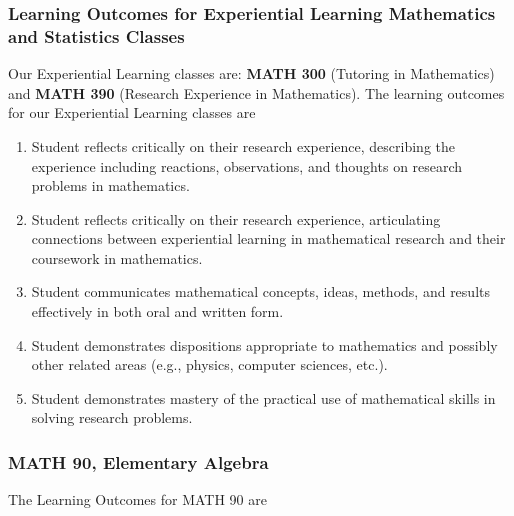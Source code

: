 \documentclass[10pt]{article}
\newenvironment{alphalist}{
\begin{enumerate}[label=(\arabic*),widest=107 ,leftmargin=25pt, itemsep=0pt]}
{\end{enumerate}}
\begin{document}
\subsubsection*{Learning Outcomes for Experiential Learning Mathematics and Statistics Classes}

Our Experiential Learning classes are: \textbf{MATH 300} 
(Tutoring in Mathematics) and \textbf{MATH 390} (Research Experience in Mathematics).
The learning outcomes for our Experiential Learning classes are
\begin{alphalist}
    \item  Student reflects critically on their research experience, describing the experience including reactions, observations, and thoughts on research problems in mathematics.
\item Student reflects critically on their research experience, articulating connections between experiential learning in mathematical research and their coursework in mathematics.
\item Student communicates mathematical concepts, ideas, methods, and results effectively in both oral and written form. 
\item Student demonstrates dispositions appropriate to mathematics and possibly other related areas (e.g., physics, computer sciences, etc.).
\item Student demonstrates mastery of the practical use of mathematical skills in solving research problems.
\end{alphalist}

\subsubsection*{MATH 90, Elementary Algebra}

The Learning Outcomes for MATH 90 are
\end{document}

